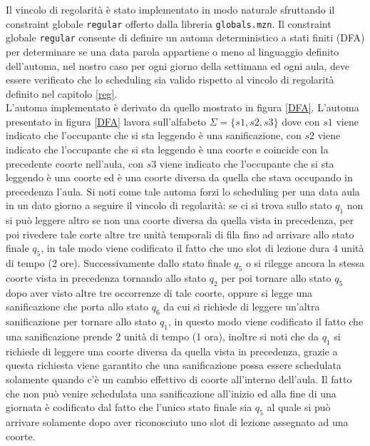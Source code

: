 \documentclass[12pt, italian, openany]{book}
\begin{document}
Il vincolo di regolarità è stato implementato in modo naturale sfruttando il constraint globale \texttt{regular} offerto dalla libreria \texttt{globals.mzn}. Il constraint globale \texttt{regular} consente di definire un automa deterministico a stati finiti (DFA) per determinare se una data parola appartiene o meno al linguaggio definito dell'automa, nel nostro caso per ogni giorno della settimana ed ogni aula, deve essere verificato che lo scheduling sia valido rispetto al vincolo di regolarità definito nel capitolo \ref{reg}.\\
L'automa implementato è derivato da quello mostrato in figura \ref{DFA}.
L'automa presentato in figura \ref{DFA} lavora sull'alfabeto $\Sigma = \lbrace s1, s2, s3 \rbrace$ dove con $s1$ viene indicato che l'occupante che si sta leggendo è una sanificazione, con $s2$ viene indicato che l'occupante che si sta leggendo è una coorte e coincide con la precedente coorte nell'aula, con $s3$ viene indicato che l'occupante che si sta leggendo è una coorte ed è una coorte diversa da quella che stava occupando in precedenza l'aula.
Si noti come tale automa forzi lo scheduling per una data aula in un dato giorno a seguire il vincolo di regolarità: se ci si trova sullo stato $q_1$ non si può leggere altro se non una coorte diversa da quella vista in precedenza, per poi rivedere tale corte altre tre unità temporali di fila fino ad arrivare allo stato finale $q_5$, in tale modo viene codificato il fatto che uno slot di lezione dura $4$ unità di tempo (2 ore). Successivamente dallo stato finale $q_5$ o si rilegge ancora la stessa coorte vista in precedenza tornando allo stato $q_2$ per poi tornare allo stato $q_5$ dopo aver visto altre tre occorrenze di tale coorte, oppure si legge una sanificazione che porta allo stato $q_6$ da cui si richiede di leggere un'altra sanificazione per tornare allo stato $q_1$, in questo modo viene codificato il fatto che una sanificazione prende $2$ unità di tempo (1 ora), inoltre si noti che da $q_1$ si richiede di leggere una coorte diversa da quella vista in precedenza, grazie a questa richiesta viene garantito che una sanificazione possa essere schedulata solamente quando c'è un cambio effettivo di coorte all'interno dell'aula. Il fatto che non può venire schedulata una sanificazione all'inizio ed alla fine di una giornata è codificato dal fatto che l'unico stato finale sia $q_5$ al quale si può arrivare solamente dopo aver riconosciuto uno slot di lezione assegnato ad una coorte.
\end{document}
